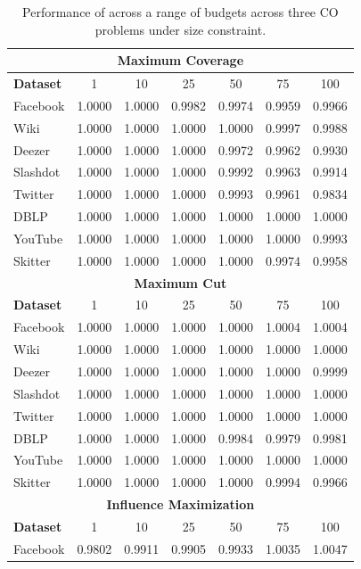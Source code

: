 {\begin{table}[h!]
\centering
\caption{Performance of \llm across a range of budgets across three CO problems under size constraint.}
\label{tab:multibudget_size}
\begin{tabular}{lcccccc}
\toprule
\multicolumn{7}{c}{\textbf{Maximum Coverage}} \\
\midrule
\textbf{Dataset} & 1 & 10 & 25 & 50 & 75 & 100 \\
\midrule
Facebook & 1.0000 & 1.0000 & 0.9982 & 0.9974 & 0.9959 & 0.9966 \\
Wiki & 1.0000 & 1.0000 & 1.0000 & 1.0000 & 0.9997 & 0.9988 \\
Deezer & 1.0000 & 1.0000 & 1.0000 & 0.9972 & 0.9962 & 0.9930 \\
Slashdot & 1.0000 & 1.0000 & 1.0000 & 0.9992 & 0.9963 & 0.9914 \\
Twitter & 1.0000 & 1.0000 & 1.0000 & 0.9993 & 0.9961 & 0.9834 \\
DBLP & 1.0000 & 1.0000 & 1.0000 & 1.0000 & 1.0000 & 1.0000 \\
YouTube & 1.0000 & 1.0000 & 1.0000 & 1.0000 & 1.0000 & 0.9993 \\
Skitter & 1.0000 & 1.0000 & 1.0000 & 1.0000 & 0.9974 & 0.9958 \\
\midrule
\multicolumn{7}{c}{\textbf{Maximum Cut}} \\
\midrule
\textbf{Dataset} & 1 & 10 & 25 & 50 & 75 & 100 \\
\midrule
Facebook & 1.0000 & 1.0000 & 1.0000 & 1.0000 & 1.0004 & 1.0004 \\
Wiki & 1.0000 & 1.0000 & 1.0000 & 1.0000 & 1.0000 & 1.0000 \\
Deezer & 1.0000 & 1.0000 & 1.0000 & 1.0000 & 1.0000 & 0.9999 \\
Slashdot & 1.0000 & 1.0000 & 1.0000 & 1.0000 & 1.0000 & 1.0000 \\
Twitter & 1.0000 & 1.0000 & 1.0000 & 1.0000 & 1.0000 & 1.0000 \\
DBLP & 1.0000 & 1.0000 & 1.0000 & 0.9984 & 0.9979 & 0.9981 \\
YouTube & 1.0000 & 1.0000 & 1.0000 & 1.0000 & 1.0000 & 1.0000 \\
Skitter & 1.0000 & 1.0000 & 1.0000 & 1.0000 & 0.9994 & 0.9966 \\
\midrule
\multicolumn{7}{c}{\textbf{Influence Maximization}} \\
\midrule
\textbf{Dataset} & 1 & 10 & 25 & 50 & 75 & 100 \\
\midrule
Facebook & 0.9802 & 0.9911 & 0.9905 & 0.9933 & 1.0035 & 1.0047 \\

\end{tabular}
\end{table}}
